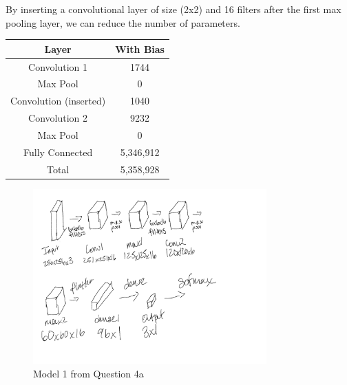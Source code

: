 \documentclass[12pt]{article}
\begin{document}
\begin{enumerate}
\begin{enumerate}
                    By inserting a convolutional layer of size (2x2) and 16
                    filters after the first max pooling layer, we can reduce the
                    number of parameters.
                    \begin{table}[h]
                        \centering
                        \begin{tabular}{|cc|}
                            \hline
                            \textbf{Layer}         & \textbf{With Bias} \\
                            \hline
                            Convolution 1          & 1744               \\
                            \hline
                            Max Pool               & 0                  \\
                            \hline
                            Convolution (inserted) & 1040               \\
                            \hline
                            Convolution 2          & 9232               \\
                            \hline
                            Max Pool               & 0                  \\
                            \hline
                            Fully Connected        & 5,346,912          \\
                            \hline
                            Total                  & 5,358,928          \\
                            \hline
                        \end{tabular}
                    \end{table}
          \end{enumerate}

          \begin{figure}
              \centering
              \includegraphics[width=0.8\textwidth]{assets/test2/model1.png}
              \caption{Model 1 from Question 4a}
              \label{fig:model1}
          \end{figure}


\end{enumerate}
\end{document}
